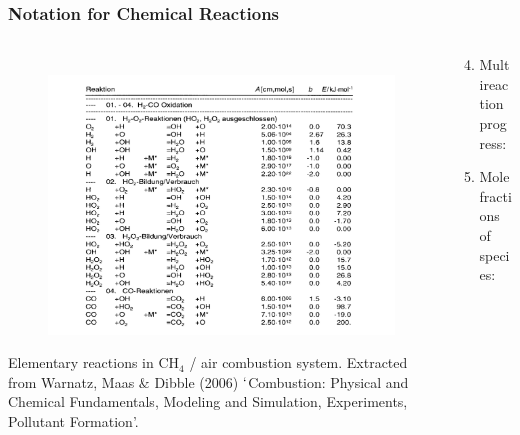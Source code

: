 \documentclass[10pt,compress,unknownkeysallowed]{beamer}
\begin{document}
\begin{frame}
  \frametitle{Notation for Chemical Reactions}
  \begin{columns}
     \begin{column}[l]{0.5\linewidth}\scriptsize
      \begin{figure}%
        \hbox{\hspace{-.2cm}
          \includegraphics[width=1.3\columnwidth,clip]{./../Pics/ChemicalReactions_Reactions}}
      \end{figure}    \scriptsize\vspace{-.5cm}
       Elementary reactions in CH$_{4}$ / air combustion system. Extracted from Warnatz, Maas $\&$ Dibble (2006) $\lq$Combustion: Physical and Chemical Fundamentals, Modeling and Simulation, Experiments, Pollutant Formation'.
     \end{column}
     \begin{column}[l]{0.5\linewidth}%
        \begin{enumerate} \setcounter{enumi}{3}
           \item<1-> Multireaction progress:
           \item<2-> Mole fractions of species:     
        \end{enumerate}
     \end{column}
  \end{columns}
\end{frame}
\normalsize
\end{document}
